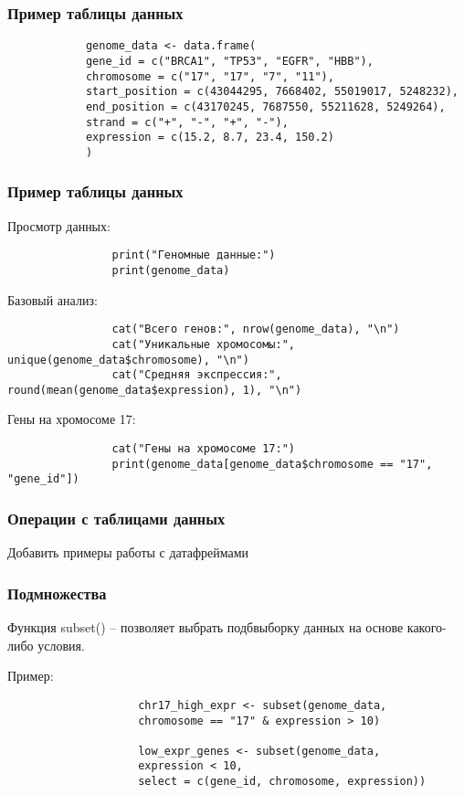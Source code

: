 \documentclass[10pt]{beamer}
\begin{document}
	\begin{frame}[fragile]
		
		
		\frametitle{Пример таблицы данных}
		
		\begin{verbatim}
			genome_data <- data.frame(
			gene_id = c("BRCA1", "TP53", "EGFR", "HBB"),
			chromosome = c("17", "17", "7", "11"),
			start_position = c(43044295, 7668402, 55019017, 5248232),
			end_position = c(43170245, 7687550, 55211628, 5249264),
			strand = c("+", "-", "+", "-"),
			expression = c(15.2, 8.7, 23.4, 150.2)
			)
		\end{verbatim}	
	\end{frame}
	
	\begin{frame}[fragile]
		\frametitle{Пример таблицы данных}
		\begin{exampleblock}{Просмотр данных:}
			\begin{verbatim}
				print("Геномные данные:")
				print(genome_data)
			\end{verbatim}
		\end{exampleblock}
		
		\begin{exampleblock}{Базовый анализ:}
			\begin{verbatim}
				cat("Всего генов:", nrow(genome_data), "\n")
				cat("Уникальные хромосомы:", unique(genome_data$chromosome), "\n")
				cat("Средняя экспрессия:", round(mean(genome_data$expression), 1), "\n")
			\end{verbatim}
		\end{exampleblock}
		
		\begin{exampleblock}{Гены на хромосоме 17:}
			\begin{verbatim}
				cat("Гены на хромосоме 17:")
				print(genome_data[genome_data$chromosome == "17", "gene_id"])
			\end{verbatim}
		\end{exampleblock}
	\end{frame}
	
	
	\begin{frame}
		
		
		\frametitle{Операции с таблицами данных}
		
		Добавить примеры работы с датафреймами
	\end{frame}
	
	\begin{frame}[fragile]
		\frametitle{Подмножества}
		Функция subset() – позволяет выбрать подбвыборку данных на основе какого-либо условия.
		{\fontsize{8}{9}\selectfont
			\begin{exampleblock}{Пример:}
				\begin{verbatim}
					chr17_high_expr <- subset(genome_data, 
					chromosome == "17" & expression > 10)
					
					low_expr_genes <- subset(genome_data, 
					expression < 10, 
					select = c(gene_id, chromosome, expression))\end{verbatim}
			\end{exampleblock}
		}
		
		
	\end{frame}
	
\end{document}
